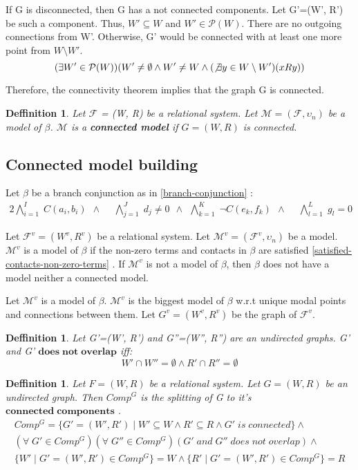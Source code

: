 \documentclass{article}
\newcommand\M{\mathcal{M}}
\newcommand\F{\mathcal{F}}
\newcommand\p{\mathcal{P}}
\newtheorem{defn}[theorem]{Deffinition}
\newcommand{\BranchConjunction}{%
\begin{alignat}{2}
			\bigwedge_{i=1}^{I} \; C(a_i, b_i) \:\: \wedge \:\: &
			\bigwedge_{j=1}^{J} \; d_j \neq 0 \:\: \wedge \:\:
			\bigwedge_{k=1}^{K} \; \neg C(e_k, f_k) \:\: \wedge \:\: &
			\bigwedge_{l=1}^{L} \; g_l = 0 \:\:
\end{alignat}%
}
\begin{document}
	If G is disconnected, then G has a not connected components. Let G'=(W', R') be such a component. Thus, $W' \subseteq W$ and $W' \in \p(W)$. There are no outgoing connections from W'. Otherwise, G' would be connected with at least one more point from $W \setminus W'$.
		\begin{equation}
			(\exists W' \in \p(W))(W' \neq \emptyset \land W' \neq W \land (\not\exists y \in W \setminus W')(xRy))
		\end{equation}

	Therefore, the connectivity theorem implies that the graph G is connected.

	\begin{defn}
		Let $\F$ = (W, R) be a relational system. Let $\M = (\F, \upsilon_n)$ be a model of $\beta$. $\M$ is a \textbf{connected model} if $G = (W, R)$ is connected.
	\end{defn}

	\subsection{Connected model building}
	\label{connected-model-building}

		Let $\beta$ be a branch conjunction as in \ref{branch-conjunction} :
		\nonumber\BranchConjunction

		Let $\F^v = (W^v, R^v)$ be a relational system. Let $\M^v = (\F^v, \upsilon_n)$ be a model. $\M^v$ is a model of $\beta$ if the non-zero terms and contacts in $\beta$ are satisfied \ref{satisfied-contacts-non-zero-terms} .	If $\M^v$ is not a model of $\beta$, then $\beta$ does not have a model neither a connected model.

		Let $\M^v$ is a model of $\beta$. $\M^v$ is the biggest model of $\beta$ w.r.t unique modal points and connections between them. Let $G^v=(W^v, R^v)$ be the graph of $\F^v$.

		\begin{defn}
			Let G'=(W', R') and G''=(W'', R'') are an undirected graphs. G' and G' $\mathbf{does \; not \; overlap}$ iff:
			\begin{equation}
				W' \cap W'' = \emptyset \land R' \cap R'' = \emptyset
			\end{equation}
		\end{defn}

		\begin{defn}
			Let $F = (W, R)$ be a relational system. Let $G = (W, R)$ be an undirected graph. Then $Comp^G$ is the splitting of G to it's $\mathbf{connected \; components}$ .
			\begin{align*}
				Comp^G = \{G'=(W', R') \mid W' \subseteq W \land R' \subseteq R \land G'\;is\;connected \} \land \\
				(\forall \; G' \in Comp^G)(\forall \; G'' \in Comp^G)(G' \; and \; G'' \; does \; not \; overlap) \land \\
				\{ W' \mid G'=(W', R') \in Comp^G \} = W \land \{ R' \mid G'=(W', R') \in Comp^G \} = R
			\end{align*}
		\end{defn}
\end{document}
